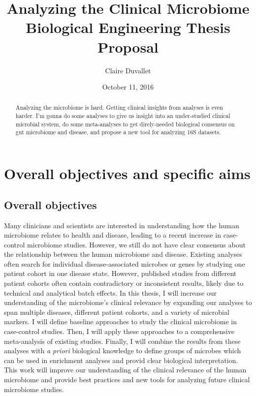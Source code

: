 \documentclass[12pt]{article}
\title{Analyzing the Clinical Microbiome \\ Biological Engineering Thesis Proposal}
\author{Claire Duvallet}
\date{October 11, 2016}
\begin{document}
\maketitle
\newpage

\begin{abstract}
Analyzing the microbiome is hard. Getting clinical insights from analyses is even harder. I'm gonna do some analyses to give us insight into an under-studied clinical microbial system, do some meta-analyses to get direly-needed biological consensus on gut microbiome and disease, and propose a new tool for analyzing 16S datasets.
\end{abstract}
\newpage

\section{Overall objectives and specific aims}
\subsection{Overall objectives}

Many clinicians and scientists are interested in understanding how the human microbiome relates to health and disease, leading to a recent increase in case-control microbiome studies. However, we still do not have clear consensus about the relationship between the human microbiome and disease. Existing analyses often search for individual disease-associated microbes or genes by studying one patient cohort in one disease state. However, published studies from different patient cohorts often contain contradictory or inconsistent results, likely due to technical and analytical batch effects. In this thesis, I will increase our understanding of the microbiome's clinical relevance by expanding our analyses to span multiple diseases, different patient cohorts, and a variety of microbial markers. I will define baseline approaches to study the clinical microbiome in case-control studies. Then, I will apply these approaches to a comprehensive meta-analysis of existing studies. Finally, I will combine the results from these analyses with \textit{a priori} biological knowledge to define groups of microbes which can be used in enrichment analyses and provid clear biological interpretation. This work will improve our understanding of the clinical relevance of the human microbiome and provide best practices and new tools for analyzing future clinical microbiome studies.
\end{document}
